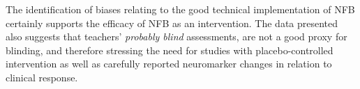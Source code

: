The identification of biases relating to the good technical implementation of NFB 
certainly supports the efficacy of NFB as an
intervention. The data presented also suggests that teachers' \emph{probably blind} assessments, are
not a good proxy for blinding, 
and therefore stressing the need for studies with placebo-controlled
intervention as well as carefully reported neuromarker changes in relation to
clinical response. 



